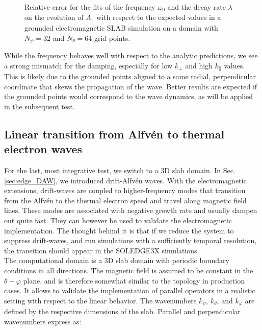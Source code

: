\begin{figure}[H]
\begin{subfigure}[b]{0.45\textwidth}
		\label{fig:electromagneticSLAB_errorGrounded_kPerp_fixed}
	\end{subfigure}
	\caption{Relative error for the fits of the frequency $\omega_0$ and the decay rate $\lambda$ on the evolution of $A_\parallel$ with respect to the expected values in a grounded electromagnetic SLAB simulation on a domain with $N_\psi=32$ and $N_\theta=64$ grid points.}
	\label{fig:electromagneticSLAB_errorGrounded}
\end{figure}

While the frequency behaves well with respect to the analytic predictions, we see a strong mismatch for the damping, especially for low $k_\perp$ and high $k_\parallel$ values. This is likely due to the grounded points aligned to a same radial, perpendicular coordinate that skews the propagation of the wave. Better results are expected if the grounded points would correspond to the wave dynamics, as will be applied in the subsequent test.


\subsection{Linear transition from Alfvén to thermal electron waves}

For the last, most integrative test, we switch to a 3D slab domain. In Sec. \ref{sec:edge_DAW}, we introduced drift-Alfvén waves. With the electromagnetic extensions, drift-waves are coupled to higher-frequency modes that transition from the Alfvén to the thermal electron speed and travel along magnetic field lines. These modes are associated with negative growth rate and usually dampen out quite fast. They can however be used to validate the electromagnetic implementation. The thought behind it is that if we reduce the system to suppress drift-waves, and run simulations with a sufficiently temporal resolution, the transition should appear in the SOLEDGE3X simulations. \\

The computational domain is a 3D slab domain with periodic boundary conditions in all directions. The magnetic field is assumed to be constant in the $\theta-\varphi$ plane, and is therefore somewhat similar to the topology in production cases. It allows to validate the implementation of parallel operators in  a realistic setting with respect to the linear behavior. The wavenumbers $k_\psi$, $k_\theta$, and $k_\varphi$ are defined by the respective dimensions of the slab. Parallel and perpendicular wavenumbers express as: \newline

